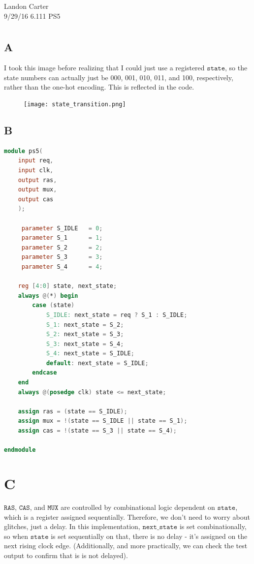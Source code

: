 \documentclass[11pt,letterpaper]{article}
\begin{document}
\noindent Landon Carter \\
9/29/16
6.111 PS5

\section{}
\subsection{A}
I took this image before realizing that I could just use a registered $\texttt{state}$, so the state numbers can actually just be 000, 001, 010, 011, and 100, respectively, rather than the one-hot encoding. This is reflected in the code.
\begin{figure}[H]
\texttt{[image: state\_transition.png]}
\end{figure}

\subsection{B}
\begin{lstlisting}[language=Verilog]
module ps5(
    input req,
    input clk,
    output ras,
    output mux,
    output cas
    );
	 
	 parameter S_IDLE   = 0;
	 parameter S_1      = 1;
	 parameter S_2      = 2;
	 parameter S_3      = 3;
	 parameter S_4      = 4;

	reg [4:0] state, next_state;
	always @(*) begin
		case (state)
			S_IDLE: next_state = req ? S_1 : S_IDLE;
			S_1: next_state = S_2;
			S_2: next_state = S_3;
			S_3: next_state = S_4;
			S_4: next_state = S_IDLE;
			default: next_state = S_IDLE;
		endcase
	end
	always @(posedge clk) state <= next_state;
	
	assign ras = (state == S_IDLE);
	assign mux = !(state == S_IDLE || state == S_1);
	assign cas = !(state == S_3 || state == S_4);

endmodule

\end{lstlisting}

\section{C}
$\texttt{RAS}$, $\texttt{CAS}$, and $\texttt{MUX}$ are controlled by combinational logic dependent on $\texttt{state}$, which is a register assigned sequentially. Therefore, we don't need to worry about glitches, just a delay. In this implementation, $\texttt{next\_state}$ is set combinationally, so when $\texttt{state}$ is set sequentially on that, there is no delay - it's assigned on the next rising clock edge. (Additionally, and more practically, we can check the test output to confirm that is is not delayed).
\end{document}
